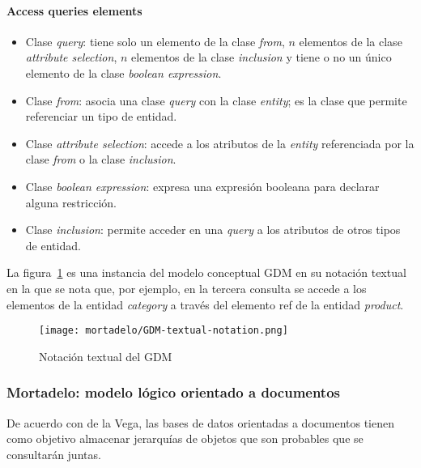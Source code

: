 \paragraph*{Access queries elements}


\begin{itemize}
    
    \item Clase \textit{query}: tiene solo un elemento de la clase \textit{from}, $n$ elementos de la clase \textit{attribute selection}, $n$ elementos de la clase \textit{inclusion} y tiene o no un único elemento de la clase \textit{boolean expression}.
    \item Clase \textit{from}: asocia una clase \textit{query} con la clase \textit{entity}; es la clase que permite referenciar un tipo de entidad.
    \item Clase \textit{attribute selection}: accede a los atributos de la \textit{entity} referenciada por la clase \textit{from} o la clase \textit{inclusion}.
    \item Clase \textit{boolean expression}: expresa una expresión booleana para declarar alguna restricción.
    \item Clase \textit{inclusion}: permite acceder en una \textit{query} a los atributos de otros tipos de entidad.
    
\end{itemize}

La figura~\ref{img:mortadelo-gdm.textual.notation} es una instancia del modelo conceptual GDM en su notación textual en la que se nota que, por ejemplo, en la tercera consulta se accede a los elementos de la entidad \textit{category} a través del elemento ref de la entidad \textit{product}.


\begin{figure}[H] 
    \centering
    \texttt{[image: mortadelo/GDM-textual-notation.png]}
    \caption{Notación textual del GDM}
    \label{img:mortadelo-gdm.textual.notation}
\end{figure}



\subsubsection*{Mortadelo: modelo lógico orientado a documentos}

De acuerdo con de la Vega\cite{de_la_vega_mortadelo_2020}, las bases de datos orientadas a documentos tienen como objetivo almacenar jerarquías de objetos que son probables que se consultarán juntas.


